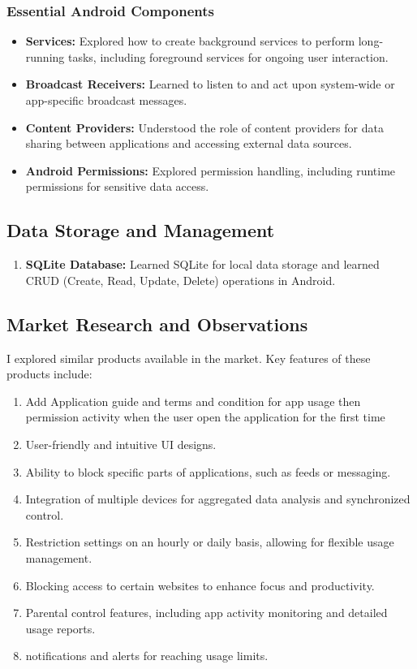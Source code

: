 \documentclass[12pt]{article}
\begin{document}
\begin{itemize}
    \subsubsection{Essential Android Components}
    \begin{itemize}
        \item \textbf{Services:} Explored how to create background services to perform long-running tasks, including foreground services for ongoing user interaction.
        \item \textbf{Broadcast Receivers:} Learned to listen to and act upon system-wide or app-specific broadcast messages.
        \item \textbf{Content Providers:} Understood the role of content providers for data sharing between applications and accessing external data sources.
        \item \textbf{Android Permissions:} Explored permission handling, including runtime permissions for sensitive data access.
    \end{itemize}
    
    \subsection{Data Storage and Management}
    \begin{enumerate}
        \item \textbf{SQLite Database:} Learned SQLite for local data storage and learned CRUD (Create, Read, Update, Delete) operations in Android.
    \end{enumerate}
    
    \subsection{Market Research and Observations}
     I explored similar products available in the market. Key features of these products include:
    \begin{enumerate}
    
        \item Add Application guide and terms and condition for app usage then permission activity when the user open the application for the first time
        \item User-friendly and intuitive UI designs.
        \item Ability to block specific parts of applications, such as feeds or messaging.
        \item Integration of multiple devices for aggregated data analysis and synchronized control.
        \item Restriction settings on an hourly or daily basis, allowing for flexible usage management.
        \item Blocking access to certain websites to enhance focus and productivity.
        \item Parental control features, including app activity monitoring and detailed usage reports.
        \item   notifications and alerts for reaching usage limits.
    \end{enumerate}

\end{itemize}
\end{document}
